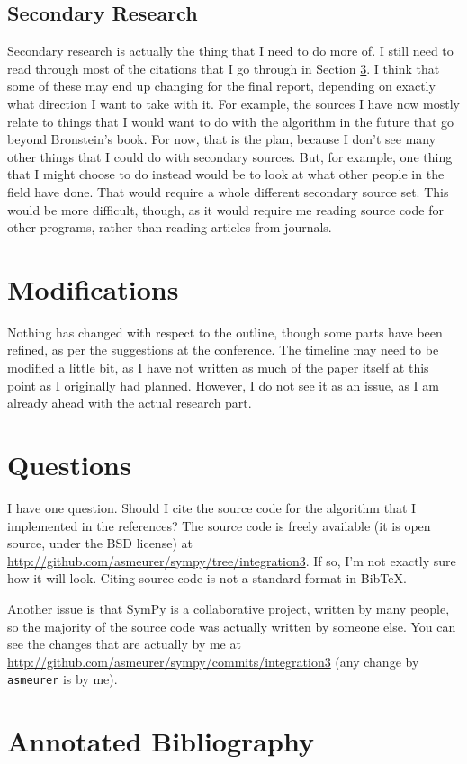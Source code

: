 \documentclass[12pt]{article}
\newcommand{\BibTeX}{{\sc Bib}\TeX}
\begin{document}
\subsection{Secondary Research}
Secondary research is actually the thing that I need to do more of. I
still need to read through most of the citations that I go through in
Section \ref{annotated-bib}.  I think that some of these may end up
changing for the final report, depending on exactly what direction I
want to take with it.  For example, the sources I have now mostly relate
to things that I would want to do with the algorithm in the future that
go beyond Bronstein's book.  For now, that is the plan, because I don't
see many other things that I could do with secondary sources.  But, for
example, one thing that I might choose to do instead would be to look at
what other people in the field have done.  That would require a whole
different secondary source set.  This would be more difficult, though,
as it would require me reading source code for other programs, rather
than reading articles from journals.

\section{Modifications}
Nothing has changed with respect to the outline, though some parts have
been refined, as per the suggestions at the conference.  The timeline
may need to be modified a little bit, as I have not written as much of
the paper itself at this point as I originally had planned.  However, I
do not see it as an issue, as I am already ahead with the actual
research part.

\section{Questions}
I have one question.  Should I cite the source code for the algorithm
that I implemented in the references?  The source code is freely
available (it is open source, under the BSD license) at
\url{http://github.com/asmeurer/sympy/tree/integration3}.  If so, I'm
not exactly sure how it will look.  Citing source code is not a standard
format in \BibTeX.  

Another issue is that Sym\-Py is a collaborative project, written by many
people, so the majority of the source code was actually written by
someone else.  You can see the changes that are actually by me at
\url{http://github.com/asmeurer/sympy/commits/integration3} (any change
by \texttt{asmeurer} is by me).

\section{Annotated Bibliography}
\label{annotated-bib}

\nocite{*}


\end{document}
